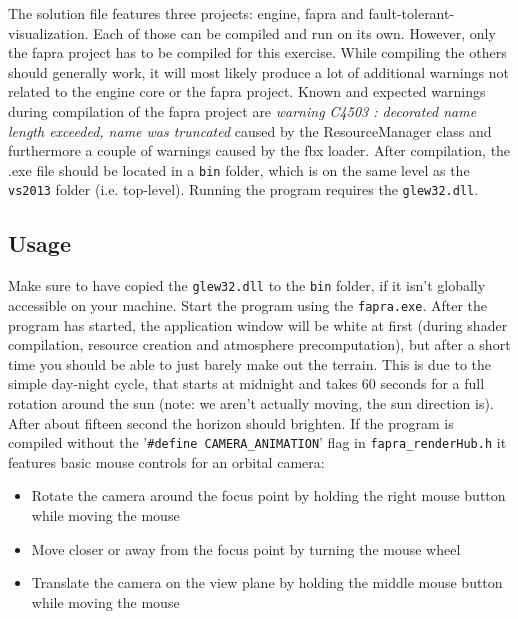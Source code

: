 \documentclass[12pt]{article}
\begin{document}
\vspace{1cm}\newline
The solution file features three projects: engine, fapra and fault-tolerant-visualization. Each of those can be compiled and run on its own. However, only the fapra project has to be compiled for this exercise. While compiling the others should generally work, it will most likely produce a lot of additional warnings not related to the engine core or the fapra project. Known and expected warnings during compilation of the fapra project are \textit{warning C4503 : decorated name length exceeded, name was truncated} caused by the ResourceManager class and furthermore a couple of warnings caused by the fbx loader.\vspace{1cm} \newline
After compilation, the .exe file should be located in a \texttt{bin} folder, which is on the same level as the \texttt{vs2013} folder (i.e. top-level). Running the program requires the \texttt{glew32.dll}.
\subsection*{Usage}
Make sure to have copied the \texttt{glew32.dll} to the \texttt{bin} folder, if it isn't globally accessible on your machine. Start the program using the \texttt{fapra.exe}. After the program has started, the application window will be white at first (during shader compilation, resource creation and atmosphere precomputation), but after a short time you should be able to just barely make out the terrain. This is due to the simple day-night cycle, that starts at midnight and takes 60 seconds for a full rotation around the sun (note: we aren't actually moving, the sun direction is). After about fifteen second the horizon should brighten.\vspace{1cm}\newline
If the program is compiled without the '\texttt{\#define CAMERA\_ANIMATION}' flag in \texttt{fapra\_renderHub.h} it features basic mouse controls for an orbital camera:
\begin{itemize}
\item Rotate the camera around the focus point by holding the right mouse button while moving the mouse
\item Move closer or away from the focus point by turning the mouse wheel
\item Translate the camera on the view plane by holding the middle mouse button while moving the mouse
\end{itemize}
\end{document}
